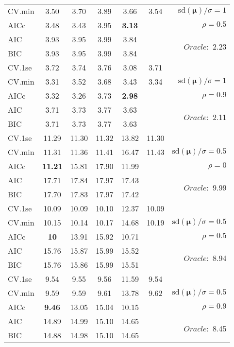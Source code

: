 \begin{table}
\begin{center}
\begin{tabular}{l*{5}{c}|r}
CV.min & 3.50 & 3.70 & 3.89 & 3.66 & 3.54 &  $\mathrm{sd}(\mathbf{\mu})/\sigma=1$ \\
AICc & 3.48 & 3.43 & 3.95 & {\bf 3.13} & & $\rho=0.5$ \\
AIC & 3.93 & 3.95 & 3.99 & 3.84 & &  \multirow{2}{*}{$Oracle: $ 2.23} \\
BIC & 3.93 & 3.95 & 3.99 & 3.84 & &  \\
 \hline 
CV.1se & 3.72 & 3.74 & 3.76 & 3.08 & 3.71 & \\
CV.min & 3.31 & 3.52 & 3.68 & 3.43 & 3.34 &  $\mathrm{sd}(\mathbf{\mu})/\sigma=1$ \\
AICc & 3.32 & 3.26 & 3.73 & {\bf 2.98} & & $\rho=0.9$ \\
AIC & 3.71 & 3.73 & 3.77 & 3.63 & &  \multirow{2}{*}{$Oracle: $ 2.11} \\
BIC & 3.71 & 3.73 & 3.77 & 3.63 & &  \\
 \hline 
CV.1se & 11.29 & 11.30 & 11.32 & 13.82 & 11.30 & \\
CV.min & 11.31 & 11.36 & 11.41 & 16.47 & 11.43 &  $\mathrm{sd}(\mathbf{\mu})/\sigma=0.5$ \\
AICc & {\bf 11.21} & 15.81 & 17.90 & 11.99 & & $\rho=0$ \\
AIC & 17.71 & 17.84 & 17.97 & 17.43 & &  \multirow{2}{*}{$Oracle: $ 9.99} \\
BIC & 17.70 & 17.83 & 17.97 & 17.42 & &  \\
 \hline 
CV.1se & 10.09 & 10.09 & 10.10 & 12.37 & 10.09 & \\
CV.min & 10.15 & 10.14 & 10.17 & 14.68 & 10.19 &  $\mathrm{sd}(\mathbf{\mu})/\sigma=0.5$ \\
AICc & {\bf 10} & 13.91 & 15.92 & 10.71 & & $\rho=0.5$ \\
AIC & 15.76 & 15.87 & 15.99 & 15.52 & &  \multirow{2}{*}{$Oracle: $ 8.94} \\
BIC & 15.76 & 15.86 & 15.99 & 15.51 & &  \\
 \hline 
CV.1se & 9.54 & 9.55 & 9.56 & 11.59 & 9.54 & \\
CV.min & 9.59 & 9.59 & 9.61 & 13.78 & 9.62 &  $\mathrm{sd}(\mathbf{\mu})/\sigma=0.5$ \\
AICc & {\bf 9.46} & 13.05 & 15.04 & 10.15 & & $\rho=0.9$ \\
AIC & 14.89 & 14.99 & 15.10 & 14.65 & &  \multirow{2}{*}{$Oracle: $ 8.45} \\
BIC & 14.88 & 14.98 & 15.10 & 14.65 & &  \\
 \hline 
\end{tabular}
\end{center}
\vspace{-1cm}
\end{table}





